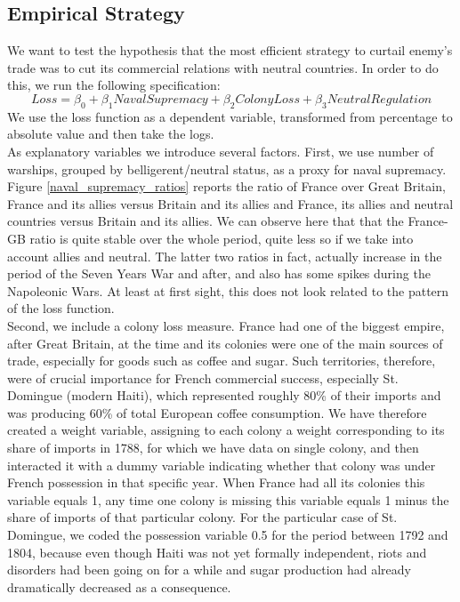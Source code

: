 \documentclass[12pt,a4paper,notitlepage,english]{article}
\begin{document}
\subsection{Empirical Strategy}
We want to test the hypothesis that the most efficient strategy to curtail enemy's trade was to cut its commercial relations with neutral countries. In order to do this, we run the following specification: 
\begin{equation*}
Loss = \beta_0 + \beta_1NavalSupremacy+ \beta_2ColonyLoss+ \beta_3NeutralRegulation
\end{equation*}
We use the loss function as a dependent variable, transformed from percentage to absolute value and then take the logs. \\
As explanatory variables we introduce several factors. First, we use number of warships, grouped by belligerent/neutral status, as a proxy for naval supremacy. Figure \ref{naval_supremacy_ratios} reports the ratio of France over Great Britain, France and its allies versus Britain and its allies and France, its allies and neutral countries versus Britain and its allies. We can observe here that that the France-GB ratio is quite stable over the whole period, quite less so if we take into account allies and neutral. The latter two ratios in fact, actually increase in the period of the Seven Years War and after, and also has some spikes during the Napoleonic Wars. At least at first sight, this does not look related to the pattern of the loss function. \\
Second, we include a colony loss measure. France had one of the biggest empire, after Great Britain, at the time and its colonies were one of the main sources of trade, especially for goods such as coffee and sugar. Such territories, therefore, were of crucial importance for French commercial success, especially St. Domingue (modern Haiti), which represented roughly 80\% of their imports and was producing 60\% of total European coffee consumption. We have therefore created a weight variable, assigning to each colony a weight corresponding to its share of imports in 1788, for which we have data on single colony, and then interacted it with a dummy variable indicating whether that colony was under French possession in that specific year. When France had all its colonies this variable equals 1, any time one colony is missing this variable equals 1 minus the share of imports of that particular colony. For the particular case of St. Domingue, we coded the possession variable 0.5 for the period between 1792 and 1804, because even though Haiti was not yet formally independent, riots and disorders had been going on for a while and sugar production had already dramatically decreased as a consequence. 
\end{document}
